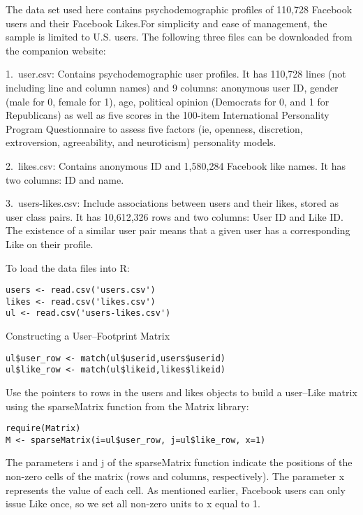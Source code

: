 The data set used here contains psychodemographic profiles of 
110,728 Facebook users and their Facebook Likes.For simplicity and
 ease of management, the sample is limited to U.S. users. The 
following three files can be downloaded from the companion website:

1.\ user.csv: Contains psychodemographic user profiles. It has 
110,728 lines (not including line and column names) and 9 columns:
 anonymous user ID, gender (male for 0, female for 1), age, 
political opinion (Democrats for 0, and 1 for Republicans) 
as well as five scores in the 100-item International Personality 
Program Questionnaire to assess five factors (ie, openness, 
discretion, extroversion, agreeability, and neuroticism) 
personality models.

2.\ likes.csv: Contains anonymous ID and 1,580,284 Facebook like 
names. It has two columns: ID and name.

3.\ users-likes.csv: Include associations between users and their 
likes, stored as user class pairs. It has 10,612,326 rows and two 
columns: User ID and Like ID. The existence of a similar user pair
 means that a given user has a corresponding Like on their profile.

To load the data files into R:

\begin{verbatim}
users <- read.csv('users.csv')
likes <- read.csv('likes.csv')
ul <- read.csv('users-likes.csv')
\end{verbatim}

Constructing a User–Footprint Matrix

\begin{verbatim}
ul$user_row <- match(ul$userid,users$userid)
ul$like_row <- match(ul$likeid,likes$likeid)
\end{verbatim}

Use the pointers to rows in the users and likes objects to build 
a user–Like matrix using the sparseMatrix function from the Matrix
 library:

\begin{verbatim}
require(Matrix)
M <- sparseMatrix(i=ul$user_row, j=ul$like_row, x=1)
\end{verbatim}

The parameters i and j of the sparseMatrix function indicate the 
positions of the non-zero cells of the matrix (rows and columns, 
respectively). The parameter x represents the value of each cell. 
As mentioned earlier, Facebook users can only issue Like once, so 
we set all non-zero units to x equal to 1.

